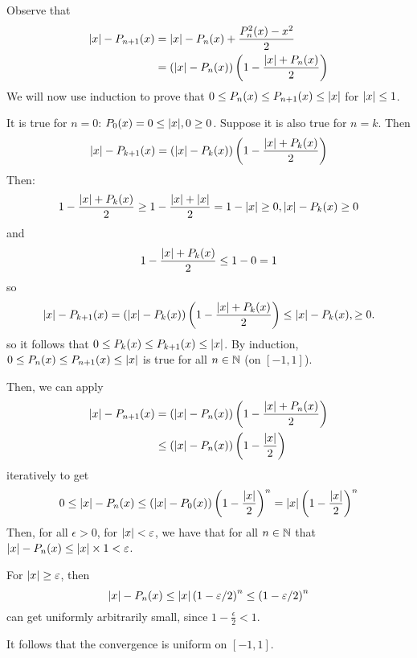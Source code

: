 \documentclass[a4paper, 12pt]{article}
\begin{document}
\begin{solution}
Observe that
\begin{align*}
    \lvert x\rvert - P_{n+1}(x) &= \lvert x\rvert - P_n(x) + \frac{P_n^2(x) - x^2}{2} \\
    &= \left(\lvert x\rvert - P_n(x)\right)\left(1 - \frac{\lvert x\rvert + P_n(x)}{2}\right) \\
\end{align*}
We will now use induction to prove that $0 \leq P_n(x) \leq P_{n+1}(x) \leq \lvert x\rvert$ for $\lvert x\rvert \leq 1$.

It is true for $n = 0$: $P_0(x) = 0 \leq \lvert x\rvert, 0 \geq 0$. Suppose it is also true for $n = k$. Then
\begin{align*}
    \lvert x\rvert - P_{k+1}(x) = \left(\lvert x\rvert - P_k(x)\right)\left(1 - \frac{\lvert x\rvert + P_k(x)}{2}\right)
\end{align*}
Then: 
\begin{equation*}
    1 - \frac{\lvert x\rvert + P_k(x)}{2} \geq 1 - \frac{\lvert x\rvert + \lvert x\rvert}{2} = 1 - \lvert x\rvert \geq 0,  \lvert x\rvert - P_k(x) \geq 0
\end{equation*}
and
\begin{equation*}
    1 - \frac{\lvert x\rvert + P_k(x)}{2}  \leq 1 - 0 = 1
\end{equation*}
so \begin{equation*}
    \lvert x\rvert - P_{k+1}(x) = \left(\lvert x\rvert - P_k(x)\right)\left(1 - \frac{\lvert x\rvert + P_k(x)}{2}\right) \leq \lvert x\rvert - P_k(x), \geq 0.
\end{equation*}
so it follows that $0 \leq P_k(x) \leq P_{k+1}(x) \leq \lvert x\rvert$. By induction, $0 \leq P_n(x) \leq P_{n+1}(x) \leq \lvert x\rvert$ is true for all $n \in \mathbb{N}$ (on $[-1, 1]$).

Then, we can apply \begin{align*}
\lvert x\rvert - P_{n+1}(x) &= \left(\lvert x\rvert - P_n(x)\right)\left(1 - \frac{\lvert x\rvert + P_n(x)}{2}\right) \\
&\leq \left(\lvert x\rvert - P_n(x)\right) \left(1 - \frac{\lvert x\rvert}{2}\right)
\end{align*}
iteratively to get \begin{equation*}
    0 \leq \lvert x\rvert - P_{n}(x) \leq (\lvert x\rvert - P_0(x)) \left(1 - \frac{\lvert x\rvert}{2}\right)^n = \lvert x\rvert \left(1 - \frac{\lvert x\rvert}{2}\right)^n
\end{equation*}
Then, for all $\epsilon > 0$, for $\lvert x\rvert < \varepsilon$, we have that for all $n \in \mathbb{N}$ that $\lvert x\rvert - P_{n}(x) \leq \lvert x\rvert \times 1 < \varepsilon$.

For $\lvert x\rvert \geq \varepsilon$, then \begin{equation*}
\lvert x\rvert - P_n(x) \leq \lvert x\rvert\left(1 - \varepsilon/2\right)^n\leq \left(1 - \varepsilon/2\right)^n
\end{equation*}
can get uniformly arbitrarily small, since $1 - \frac{\epsilon}{2} < 1$. 

It follows that the convergence is uniform on $[-1, 1]$.
\end{solution}
\end{document}

